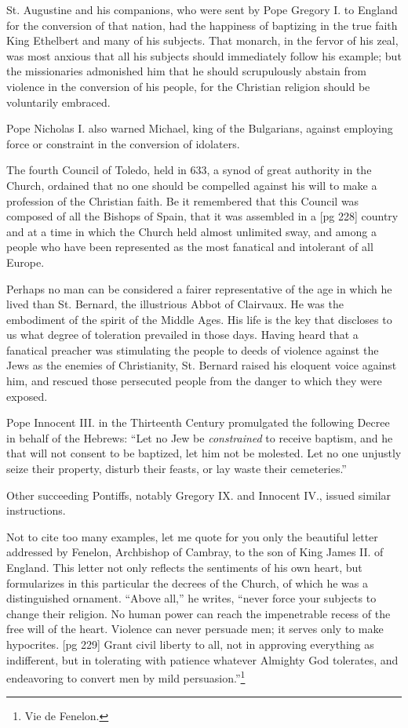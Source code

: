 St. Augustine and his companions, who were
sent by Pope Gregory I. to England for the conversion
of that nation, had the happiness of baptizing
in the true faith King Ethelbert and many
of his subjects. That monarch, in the fervor of his
zeal, was most anxious that all his subjects should
immediately follow his example; but the missionaries
admonished him that he should scrupulously
abstain from violence in the conversion of his people,
for the Christian religion should be voluntarily
embraced.

Pope Nicholas I. also warned Michael, king of
the Bulgarians, against employing force or constraint
in the conversion of idolaters.

The fourth Council of Toledo, held in 633, a
synod of great authority in the Church, ordained
that no one should be compelled against his will to
make a profession of the Christian faith. Be it remembered
that this Council was composed of all
the Bishops of Spain, that it was assembled in a
[pg 228]
country and at a time in which the Church held almost
unlimited sway, and among a people who
have been represented as the most fanatical and
intolerant of all Europe.

Perhaps no man can be considered a fairer representative
of the age in which he lived than St.
Bernard, the illustrious Abbot of Clairvaux. He
was the embodiment of the spirit of the Middle
Ages. His life is the key that discloses to us what
degree of toleration prevailed in those days. Having
heard that a fanatical preacher was stimulating
the people to deeds of violence against the Jews
as the enemies of Christianity, St. Bernard raised
his eloquent voice against him, and rescued those
persecuted people from the danger to which they
were exposed.

Pope Innocent III. in the Thirteenth Century
promulgated the following Decree in behalf of the
Hebrews: “Let no Jew be \emph{constrained} to receive
baptism, and he that will not consent to be baptized,
let him not be molested. Let no one unjustly
seize their property, disturb their feasts, or lay
waste their cemeteries.”

Other succeeding Pontiffs, notably Gregory IX.
and Innocent IV., issued similar instructions.

Not to cite too many examples, let me quote
for you only the beautiful letter addressed by
Fenelon, Archbishop of Cambray, to the son of
King James II. of England. This letter not only
reflects the sentiments of his own heart, but
formularizes in this particular the decrees of the
Church, of which he was a distinguished ornament.
“Above all,” he writes, “never force your
subjects to change their religion. No human
power can reach the impenetrable recess of the
free will of the heart. Violence can never persuade
men; it serves only to make hypocrites.
[pg 229]
Grant civil liberty to all, not in approving everything
as indifferent, but in tolerating with patience
whatever Almighty God tolerates, and endeavoring
to convert men by mild persuasion.”\footnote{Vie de Fenelon.}

